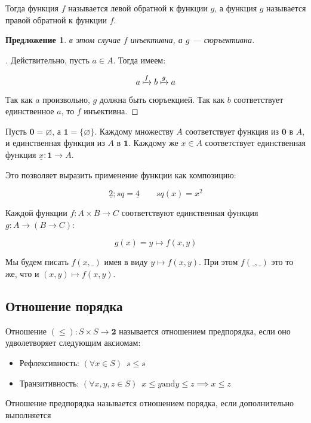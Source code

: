 \documentclass[10pt, a4paper]{article}
\newcommand{\fcomp}{\mathbin{\bm{;}}}
\theoremstyle{colon}
\newtheorem*{prop*}{Предложение}
\begin{document}
Тогда функция \(f\) называется левой обратной к функции \(g\), а
функция \(g\) называется правой обратной к функции \(f\).

\begin{prop*}
в этом случае \(f\) инъективна, а \(g\) — сюръективна.
\end{prop*}

\begin{proof}[\unskip\indent\nopunct]
Действительно, пусть \(a \in A\). Тогда имеем:
  
\[
  a \xmapsto{f} b \xmapsto{g} a
\]

Так как \(a\) произвольно, \(g\) должна быть сюръекцией. Так
как \(b\) соответствует единственное \(a\), то \(f\) инъективна.
\end{proof}

Пусть \(\bm{0} = \varnothing\), а \(\bm{1} = \{\varnothing\}\).
Каждому множеству \(A\) соответствует функция из \(\bm{0}\) в \(A\),
и единственная функция из \(A\) в \(\bm{1}\). Каждому же \(x \in A\)
соответствует единственная функция \(\underline{x}: \bm{1} \to A\).

Это позволяет выразить применение функции как композицию:

\[
\underline 2 \fcomp sq = \underline 4 \qquad sq(x) = x^2
\]

Каждой функции \(f: A \times B \to C\) соответствуют единственная функция
\(g: A \to (B \to C)\):

\[
g(x) = y \mapsto f(x, y)
\]

Мы будем писать \(f(x, \_)\) имея в виду \(y \mapsto f(x, y)\).
При этом \(f(\_, \_)\) это то же, что и \((x, y) \mapsto f(x, y)\).

\subsection{Отношение порядка}

Отношение \( (\leqslant) : S \times S \to \bm 2 \) называется отношением предпорядка,
если оно удволетворяет следующим аксиомам:

\begin{itemize}
\item Рефлексивность: \( (\forall x \in S)\enspace s \leqslant s \)
\item Транзитивность: \( (\forall x, y, z \in S)\enspace x \leqslant y \mathbin\mathrm{and} y \leqslant z \implies x \leqslant z \)
\end{itemize}

Отношение предпорядка называется отношением порядка, если дополнительно выполняется
\end{document}
